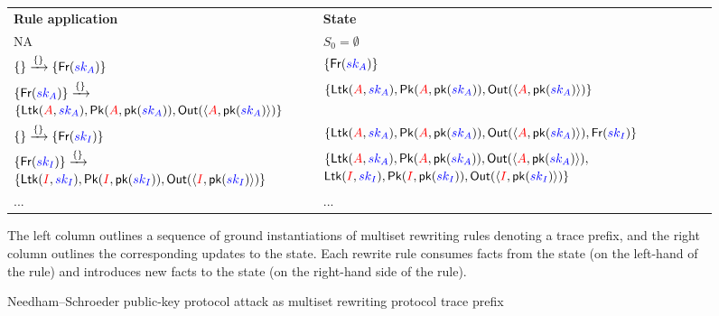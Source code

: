 \documentclass{article}
\theoremstyle{definition}
\newcommand{\blue}[1]{\textcolor{blue}{#1}}
\newcommand{\red}[1]{\textcolor{red}{#1}}
\begin{document}
\begin{figure}[h]
\centering
\small
\begin{tabular}{p{8cm}p{8cm}}

\textbf{Rule application} & \textbf{State} \\
\rowcolor{grouponeDark}
NA &
$S_0 = \emptyset$
\\[0.8em]

\rowcolor{grouponeLight}
$\{\} \xrightarrow{\{\}} \{\mathsf{Fr}(\blue{sk_A})\}$ &
$\{\mathsf{Fr}(\blue{sk_A})\}$
\\[0.8em]

\rowcolor{grouponeDark}
$\{\mathsf{Fr}(\blue{sk_A})\} \xrightarrow{\{\}}$ \newline
$\{\mathsf{Ltk}(\red{A},\blue{sk_A}),\mathsf{Pk}(\red{A},\mathsf{pk}(\blue{sk_A})),
\mathsf{Out}(\langle \red{A},\mathsf{pk}(\blue{sk_A})\rangle)\}$ &
$\{\mathsf{Ltk}(\red{A},\blue{sk_A}),
\mathsf{Pk}(\red{A},\mathsf{pk}(\blue{sk_A})),
\mathsf{Out}(\langle \red{A},\mathsf{pk}(\blue{sk_A})\rangle)\}$
\\[1.6em]

\rowcolor{grouponeLight}
$\{\} \xrightarrow{\{\}} \{\mathsf{Fr}(\blue{sk_I})\}$ &
$\{\mathsf{Ltk}(\red{A},\blue{sk_A}),
\mathsf{Pk}(\red{A},\mathsf{pk}(\blue{sk_A})),
\mathsf{Out}(\langle \red{A},\mathsf{pk}(\blue{sk_A})\rangle),
\mathsf{Fr}(\blue{sk_I})\}$
\\[0.8em]

\rowcolor{grouponeDark}
$\{\mathsf{Fr}(\blue{sk_I})\} \xrightarrow{\{\}}$\newline
$\{\mathsf{Ltk}(\red{I},\blue{sk_I}),\mathsf{Pk}(\red{I},\mathsf{pk}(\blue{sk_I})),
\mathsf{Out}(\langle \red{I},\mathsf{pk}(\blue{sk_I})\rangle)\}$ &
$\{\mathsf{Ltk}(\red{A},\blue{sk_A}),
\mathsf{Pk}(\red{A},\mathsf{pk}(\blue{sk_A})),
\mathsf{Out}(\langle \red{A},\mathsf{pk}(\blue{sk_A})\rangle),$ \newline
$\mathsf{Ltk}(\red{I},\blue{sk_I}),
\mathsf{Pk}(\red{I},\mathsf{pk}(\blue{sk_I})),
\mathsf{Out}(\langle \red{I},\mathsf{pk}(\blue{sk_I})\rangle)\}$\\[1.6em]
\rowcolor{grouponeLight}
... & ...
\end{tabular}
\begin{flushleft}
\vspace{.3em}
{\footnotesize
   The left column outlines a sequence of ground instantiations of multiset rewriting rules denoting a trace prefix, and the right column outlines the corresponding updates to the state. Each rewrite rule consumes facts from the state (on the left-hand of the rule) and introduces new facts to the state (on the right-hand side of the rule).
    }
\end{flushleft}
  \caption{ Needham--Schroeder public-key protocol attack as multiset rewriting protocol trace prefix}
  \label{fig:ns-lowe-attack-ms-prefix}
\end{figure}
\end{document}

